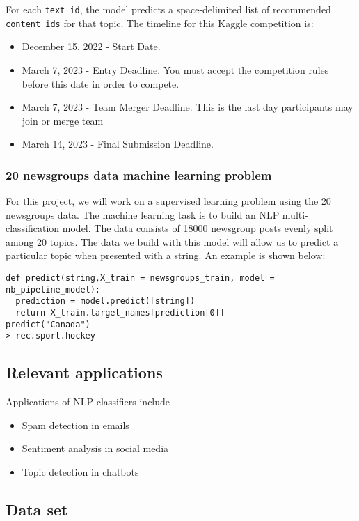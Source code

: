 \documentclass{article}
\begin{document}
For each \texttt{text\_id}, the model predicts a space-delimited list of recommended \texttt{content\_ids} for that topic. The timeline for this Kaggle competition is:

 \begin{itemize}
     \item December 15, 2022 - Start Date.
     \item March 7, 2023 - Entry Deadline. You must accept the competition rules before this date in order to compete.
     \item March 7, 2023 - Team Merger Deadline. This is the last day participants may join or merge team
     \item March 14, 2023 - Final Submission Deadline.
 \end{itemize}

\subsubsection{20 newsgroups data machine learning problem}

For this project, we will work on a  supervised learning problem using the 20 newsgroups data. The machine learning task is to build an NLP multi-classification model. The data consists of 18000 newsgroup posts evenly split among 20 topics. The data we build with this model will allow us to predict a particular topic when presented with a string. An example is shown below:

\begin{lstlisting}
def predict(string,X_train = newsgroups_train, model = nb_pipeline_model):
  prediction = model.predict([string])
  return X_train.target_names[prediction[0]]
predict("Canada")
> rec.sport.hockey
\end{lstlisting}

\subsection{Relevant applications}

Applications of NLP classifiers include 
\begin{itemize}
    \item Spam detection in emails
    \item Sentiment analysis in social media 
    \item Topic detection in chatbots
\end{itemize}

\subsection{Data set}
\end{document}
